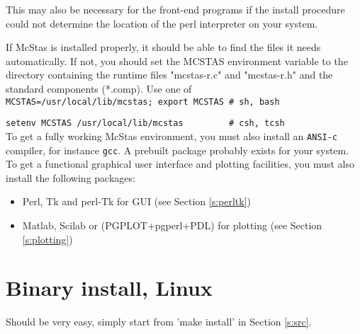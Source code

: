This may also be necessary for the front-end programs if the install
procedure could not determine the location of the perl interpreter on
your system.

If McStas is installed properly, it should be able to find the files it
needs automatically. If not, you should set the MCSTAS environment
variable to the directory containing the runtime files "mcstas-r.c" and
"mcstas-r.h" and the standard components (*.comp). Use one of\\

  \verb+MCSTAS=/usr/local/lib/mcstas; export MCSTAS # sh, bash+

  \verb+setenv MCSTAS /usr/local/lib/mcstas         # csh, tcsh+\\

%
%
%
To get a fully working McStas environment, you must also install an 
\texttt{ANSI-c} compiler, for instance \texttt{gcc}. A prebuilt package
probably exists for your system.
To get a functional graphical user interface and plotting facilities,
you must also install the following packages:
\begin{itemize}
\item{Perl, Tk and perl-Tk for GUI (see Section \ref{s:perltk})}
\item{Matlab, Scilab or (PGPLOT+pgperl+PDL) for plotting (see Section \ref{s:plotting})}
\end{itemize}

\section{Binary install, Linux}
\label{s:linbin}
Should be very easy, simply start from 'make install' in Section \ref{s:src}.

